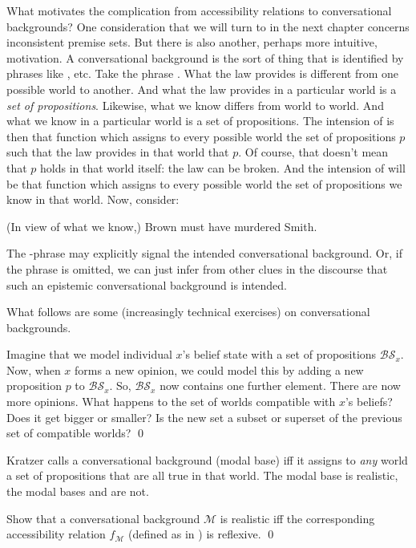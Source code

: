 What motivates the complication from accessibility relations to conversational
backgrounds? One consideration that we will turn to in the next chapter concerns
inconsistent premise sets. But there is also another, perhaps more intuitive,
motivation. A conversational background is the sort of thing that is identified
by phrases like , etc. Take the
phrase . What the law provides is different
from one possible world to another. And what the law provides in a particular
world is a \emph{set of propositions}. Likewise, what we know differs from world
to world. And what we know in a particular world is a set of propositions. The
intension of  is then that function which
assigns to every possible world the set of propositions $p$ such that the law
provides in that world that $p$. Of course, that doesn't mean that $p$ holds in
that world itself: the law can be broken. And the intension of  will be that function which assigns to every possible world the set
of propositions we know in that world. Now, consider:

\ex (In view of what we know,) Brown must have murdered Smith. \xe

The -phrase may explicitly signal the intended
conversational background. Or, if the phrase is omitted, we can just infer from
other clues in the discourse that such an epistemic conversational background is
intended. 

What follows are some (increasingly technical exercises) on conversational
backgrounds.

\begin{exercise}
  Imagine that we model individual $x$'s belief state with a set of
  propositions $\mathcal{BS}_{x}$. Now, when $x$ forms a new opinion, we could model
  this by adding a new proposition $p$ to $\mathcal{BS}_x$. So,
  $\mathcal{BS}_x$ now contains one further element. There are now more
  opinions. What happens to the set of worlds compatible with $x$'s beliefs?
  Does it get bigger or smaller? Is the new set a subset or superset of the
  previous set of compatible worlds? \qed
\end{exercise}

\begin{exercise}
  Kratzer calls a conversational background (modal base)  iff it
  assigns to \emph{any} world a set of propositions that are all true in that
  world. The modal base  is realistic, the modal bases
   and  are not.

  Show that a conversational background $\mathcal{M}$ is realistic iff the
  corresponding accessibility relation $f_{\mathcal{M}}$ (defined as in
  ) is reflexive. \qed
\end{exercise}


